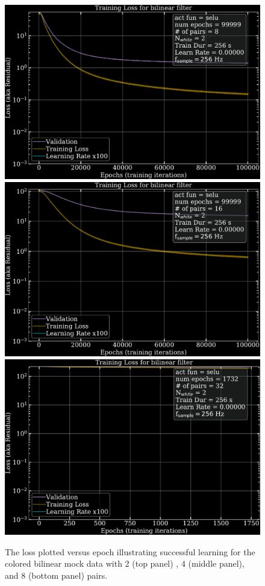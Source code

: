 \begin{refsection}
\begin{figure}[htbp]
   \centering
   \includegraphics[width=.7\columnwidth]{chapter_noise_sub/etc/loss8C}
   \includegraphics[width=.7\columnwidth]{chapter_noise_sub/etc/loss16C}
   \includegraphics[width=.7\columnwidth]{chapter_noise_sub/etc/loss32C}
   \caption{The loss plotted versus epoch illustrating successful learning for the colored bilinear mock data with 2 (top panel) , 4 (middle panel), and 8 (bottom panel) pairs.}
   \label{fig:loss1}
\end{figure}


\end{refsection}

